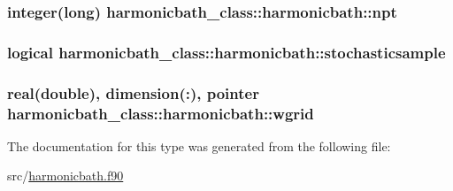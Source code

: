 \hypertarget{structharmonicbath__class_1_1harmonicbath_ab292a58613813f3ee812f949f9899089}{
\subsubsection[{npt}]{\setlength{\rightskip}{0pt plus 5cm}integer(long) harmonicbath\+\_\+class\+::harmonicbath\+::npt\hspace{0.3cm}{\ttfamily [private]}}}\label{structharmonicbath__class_1_1harmonicbath_ab292a58613813f3ee812f949f9899089}
\hypertarget{structharmonicbath__class_1_1harmonicbath_a1ae24e6ddcc5e0a0b80decc16a0865cb}{
\subsubsection[{stochasticsample}]{\setlength{\rightskip}{0pt plus 5cm}logical harmonicbath\+\_\+class\+::harmonicbath\+::stochasticsample\hspace{0.3cm}{\ttfamily [private]}}}\label{structharmonicbath__class_1_1harmonicbath_a1ae24e6ddcc5e0a0b80decc16a0865cb}
\hypertarget{structharmonicbath__class_1_1harmonicbath_a4268e843792e21ac9c78224a9e540e1f}{
\subsubsection[{wgrid}]{\setlength{\rightskip}{0pt plus 5cm}real(double), dimension(\+:), pointer harmonicbath\+\_\+class\+::harmonicbath\+::wgrid\hspace{0.3cm}{\ttfamily [private]}}}\label{structharmonicbath__class_1_1harmonicbath_a4268e843792e21ac9c78224a9e540e1f}


The documentation for this type was generated from the following file\+:\begin{DoxyCompactItemize}
\item 
src/\hyperlink{harmonicbath_8f90}{harmonicbath.\+f90}\end{DoxyCompactItemize}
